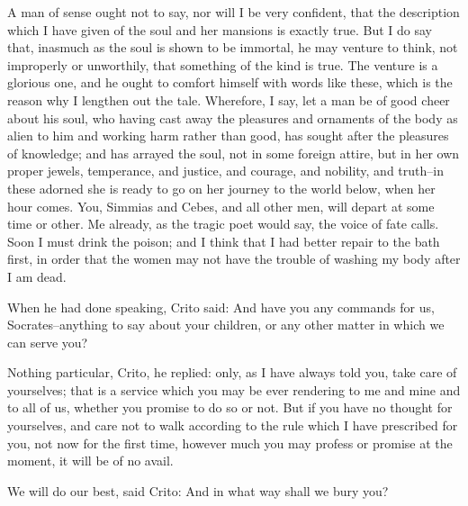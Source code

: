 A man of sense ought not to say, nor will I be very confident, that the
description which I have given of the soul and her mansions is exactly
true. But I do say that, inasmuch as the soul is shown to be immortal,
he may venture to think, not improperly or unworthily, that something of
the kind is true. The venture is a glorious one, and he ought to comfort
himself with words like these, which is the reason why I lengthen out
the tale. Wherefore, I say, let a man be of good cheer about his soul,
who having cast away the pleasures and ornaments of the body as alien to
him and working harm rather than good, has sought after the pleasures of
knowledge; and has arrayed the soul, not in some foreign attire, but
in her own proper jewels, temperance, and justice, and courage, and
nobility, and truth--in these adorned she is ready to go on her journey
to the world below, when her hour comes. You, Simmias and Cebes, and all
other men, will depart at some time or other. Me already, as the tragic
poet would say, the voice of fate calls. Soon I must drink the poison;
and I think that I had better repair to the bath first, in order that
the women may not have the trouble of washing my body after I am dead.

When he had done speaking, Crito said: And have you any commands for us,
Socrates--anything to say about your children, or any other matter in
which we can serve you?

Nothing particular, Crito, he replied: only, as I have always told
you, take care of yourselves; that is a service which you may be ever
rendering to me and mine and to all of us, whether you promise to do so
or not. But if you have no thought for yourselves, and care not to walk
according to the rule which I have prescribed for you, not now for the
first time, however much you may profess or promise at the moment, it
will be of no avail.

We will do our best, said Crito: And in what way shall we bury you?

